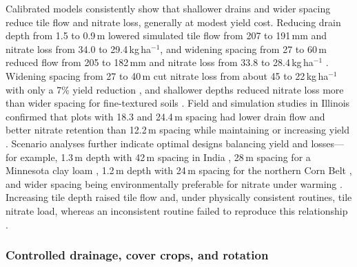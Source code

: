 \documentclass[11pt]{article}
\begin{document}
Calibrated models consistently show that shallower drains and wider spacing reduce tile flow and nitrate loss, generally at modest yield cost. Reducing drain depth from 1.5 to 0.9\,m lowered simulated tile flow from 207 to 191\,mm and nitrate loss from 34.0 to 29.4\,kg\,ha$^{-1}$, and widening spacing from 27 to 60\,m reduced flow from 205 to 182\,mm and nitrate loss from 33.8 to 28.4\,kg\,ha$^{-1}$ \parencite{Moriasi2013}. Widening spacing from 27 to 40\,m cut nitrate loss from about 45 to 22\,kg\,ha$^{-1}$ with only a 7\% yield reduction \parencite{Nangia2010c}, and shallower depths reduced nitrate loss more than wider spacing for fine-textured soils \parencite{Davis2000}. Field and simulation studies in Illinois confirmed that plots with 18.3 and 24.4\,m spacing had lower drain flow and better nitrate retention than 12.2\,m spacing while maintaining or increasing yield \parencite{Hwang2024}. Scenario analyses further indicate optimal designs balancing yield and losses---for example, 1.3\,m depth with 42\,m spacing in India \parencite{Dar2025}, 28\,m spacing for a Minnesota clay loam \parencite{Zhao2000}, 1.2\,m depth with 24\,m spacing for the northern Corn Belt \parencite{Luo2010}, and wider spacing being environmentally preferable for nitrate under warming \parencite{Ziaeifar2025}. Increasing tile depth raised tile flow and, under physically consistent routines, tile nitrate load, whereas an inconsistent routine failed to reproduce this relationship \parencite{Kim2023,Bauwe2016}.

\subsubsection{Controlled drainage, cover crops, and rotation}
\end{document}

